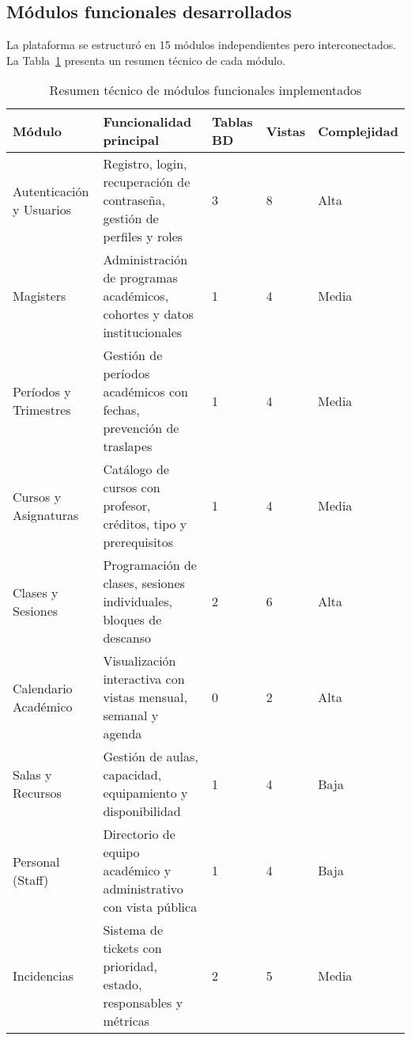 \subsection{Módulos funcionales desarrollados}

La plataforma se estructuró en 15 módulos independientes pero interconectados. La Tabla~\ref{tab:modulos-tecnico} presenta un resumen técnico de cada módulo.

\begin{table}[H]
\centering
\caption{Resumen técnico de módulos funcionales implementados}
\label{tab:modulos-tecnico}
\small
\begin{tabular}{p{3.2cm} p{5.5cm} p{1.5cm} p{1.5cm} p{1.8cm}}
\toprule
\textbf{Módulo} & \textbf{Funcionalidad principal} & \textbf{Tablas BD} & \textbf{Vistas} & \textbf{Complejidad} \\
\midrule
Autenticación y Usuarios & Registro, login, recuperación de contraseña, gestión de perfiles y roles & 3 & 8 & Alta \\[0.2cm]

Magisters & Administración de programas académicos, cohortes y datos institucionales & 1 & 4 & Media \\[0.2cm]

Períodos y Trimestres & Gestión de períodos académicos con fechas, prevención de traslapes & 1 & 4 & Media \\[0.2cm]

Cursos y Asignaturas & Catálogo de cursos con profesor, créditos, tipo y prerequisitos & 1 & 4 & Media \\[0.2cm]

Clases y Sesiones & Programación de clases, sesiones individuales, bloques de descanso & 2 & 6 & Alta \\[0.2cm]

Calendario Académico & Visualización interactiva con vistas mensual, semanal y agenda & 0 & 2 & Alta \\[0.2cm]

Salas y Recursos & Gestión de aulas, capacidad, equipamiento y disponibilidad & 1 & 4 & Baja \\[0.2cm]

Personal (Staff) & Directorio de equipo académico y administrativo con vista pública & 1 & 4 & Baja \\[0.2cm]

Incidencias & Sistema de tickets con prioridad, estado, responsables y métricas & 2 & 5 & Media \\[0.2cm]


\end{tabular}
\end{table}
